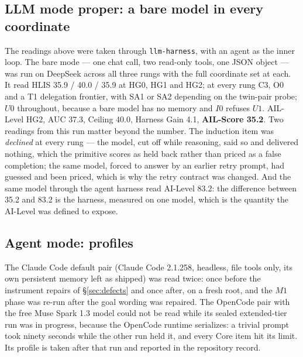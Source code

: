 \subsection{LLM mode proper: a bare model in every coordinate}

The readings above were taken through \texttt{llm-harness}, with an agent as the inner loop. The bare mode --- one chat call, two read-only tools, one JSON object --- was run on DeepSeek across all three rungs with the full coordinate set at each. It read HLIS 35.9 / 40.0 / 35.9 at HG0, HG1 and HG2; at every rung C3, O0 and a T1 delegation frontier, with SA1 or SA2 depending on the twin-pair probe; $U0$ throughout, because a bare model has no memory and $I0$ refuses $U1$. AIL-Level HG2, AUC 37.3, Ceiling 40.0, Harness Gain 4.1, \textbf{AIL-Score 35.2}. Two readings from this run matter beyond the number. The induction item was \emph{declined} at every rung --- the model, cut off while reasoning, said so and delivered nothing, which the primitive scores as held back rather than priced as a false completion; the same model, forced to answer by an earlier retry prompt, had guessed and been priced, which is why the retry contract was changed. And the same model through the agent harness read AI-Level 83.2: the difference between 35.2 and 83.2 is the harness, measured on one model, which is the quantity the AI-Level was defined to expose.

\subsection{Agent mode: profiles}

The Claude Code default pair (Claude Code 2.1.258, headless, file tools only, its own persistent memory left as shipped) was read twice: once before the instrument repairs of \S\ref{sec:defects} and once after, on a fresh root, and the $M1$ phase was re-run after the goal wording was repaired. The OpenCode pair with the free Muse Spark 1.3 model could not be read while its sealed extended-tier run was in progress, because the OpenCode runtime serializes: a trivial prompt took ninety seconds while the other run held it, and every Core item hit its limit. Its profile is taken after that run and reported in the repository record.

